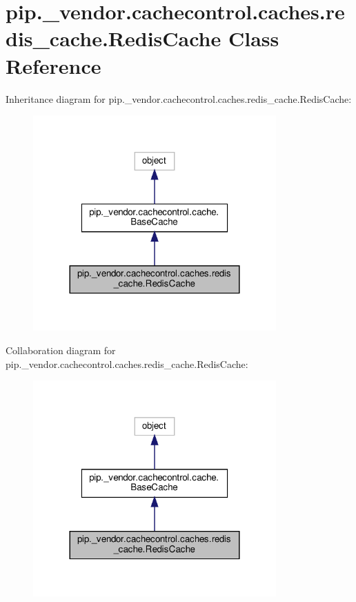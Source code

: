 \hypertarget{classpip_1_1__vendor_1_1cachecontrol_1_1caches_1_1redis__cache_1_1RedisCache}{}\section{pip.\+\_\+vendor.\+cachecontrol.\+caches.\+redis\+\_\+cache.\+Redis\+Cache Class Reference}
\label{classpip_1_1__vendor_1_1cachecontrol_1_1caches_1_1redis__cache_1_1RedisCache}


Inheritance diagram for pip.\+\_\+vendor.\+cachecontrol.\+caches.\+redis\+\_\+cache.\+Redis\+Cache\+:
\nopagebreak
\begin{figure}[H]
\begin{center}
\leavevmode
\includegraphics[width=264pt]{classpip_1_1__vendor_1_1cachecontrol_1_1caches_1_1redis__cache_1_1RedisCache__inherit__graph}
\end{center}
\end{figure}


Collaboration diagram for pip.\+\_\+vendor.\+cachecontrol.\+caches.\+redis\+\_\+cache.\+Redis\+Cache\+:
\nopagebreak
\begin{figure}[H]
\begin{center}
\leavevmode
\includegraphics[width=264pt]{classpip_1_1__vendor_1_1cachecontrol_1_1caches_1_1redis__cache_1_1RedisCache__coll__graph}
\end{center}
\end{figure}
